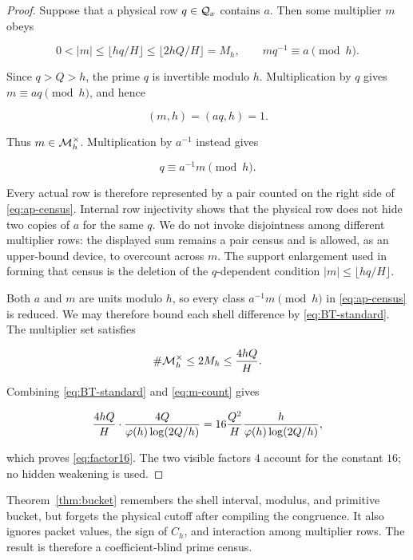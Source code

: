 \begin{proof}
Suppose that a physical row $q\in\mathcal Q_x$ contains $a$.  Then some multiplier
$m$ obeys

\[
 0<|m|\leq\lfloor hq/H\rfloor
 \leq\lfloor2hQ/H\rfloor=M_h,
 \qquad mq^{-1}\equiv a\pmod h.
\]

Since $q>Q>h$, the prime $q$ is invertible modulo $h$.  Multiplication by
$q$ gives $m\equiv aq\pmod h$, and hence

\[
 (m,h)=(aq,h)=1.
\]

Thus $m\in\mathcal M_h^{\times}$.  Multiplication by $a^{-1}$ instead gives

\begin{equation}
 q\equiv a^{-1}m\pmod h.
 \label{eq:compiled-class}
\end{equation}

Every actual row is therefore represented by a pair counted on the right side
of \eqref{eq:ap-census}.  Internal row injectivity shows that the physical row
does not hide two copies of $a$ for the same $q$.  We do not invoke
disjointness among different multiplier rows: the displayed sum remains a pair
census and is allowed, as an upper-bound device, to overcount across $m$.
The support enlargement used in forming that census is the deletion of the
$q$-dependent condition $|m|\leq\lfloor hq/H\rfloor$.

Both $a$ and $m$ are units modulo $h$, so every class
$a^{-1}m\pmod h$ in \eqref{eq:ap-census} is reduced.  We may therefore bound
each shell difference by \eqref{eq:BT-standard}.  The multiplier set satisfies

\begin{equation}
 \#\mathcal M_h^{\times}\leq2M_h\leq\frac{4hQ}{H}.
 \label{eq:m-count}
\end{equation}

Combining \eqref{eq:BT-standard} and \eqref{eq:m-count} gives

\[
 \frac{4hQ}{H}\cdot
 \frac{4Q}{\varphi(h)\log(2Q/h)}
 =16\frac{Q^2}{H}\frac{h}{\varphi(h)\log(2Q/h)},
\]

which proves \eqref{eq:factor16}.  The two visible factors $4$ account for
the constant $16$; no hidden weakening is used.
\end{proof}

\begin{remark}
Theorem~\ref{thm:bucket} remembers the shell interval, modulus, and primitive
bucket, but forgets the physical cutoff after compiling the congruence.  It
also ignores packet values, the sign of $C_h$, and interaction among
multiplier rows.  The result is therefore a coefficient-blind prime census.
\end{remark}
